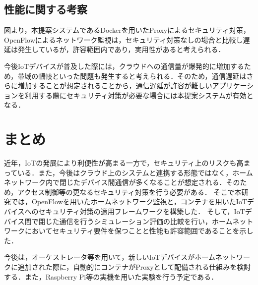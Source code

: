 \documentclass[Japanese]{dicomopapers}
\begin{document}
\subsection{性能に関する考察}
図より，本提案システムであるDockerを用いたProxyによるセキュリティ対策，OpenFlowによるネットワーク監視は，セキュリティ対策なしの場合と比較し遅延は発生しているが，許容範囲内であり，実用性があると考えられる．\par
今後IoTデバイスが普及した際には，クラウドへの通信量が爆発的に増加するため，帯域の輻輳といった問題も発生すると考えられる．そのため，通信遅延はさらに増加することが想定されることから，通信遅延が許容が難しいアプリケーションを利用する際にセキュリティ対策が必要な場合には本提案システムが有効となる．

\section{まとめ}
近年，IoTの発展により利便性が高まる一方で，セキュリティ上のリスクも高まっている．また，今後はクラウド上のシステムと連携する形態ではなく，ホームネットワーク内で閉じたデバイス間通信が多くなることが想定される．そのため，アクセス制御等の更なるセキュリティ対策を行う必要がある．
そこで本研究では，OpenFlowを用いたホームネットワーク監視と，コンテナを用いたIoTデバイスへのセキュリティ対策の適用フレームワークを構築した．
そして，IoTデバイス間で閉じた通信を行うシミュレーション評価の比較を行い，ホームネットワークにおいてセキュリティ要件を保つことと性能も許容範囲であることを示した．\par
今後は，オーケストレータ等を用いて，新しいIoTデバイスがホームネットワークに追加された際に，自動的にコンテナがProxyとして配備される仕組みを検討する．また，Raspberry Pi等の実機を用いた実験を行う予定である．
\end{document}
